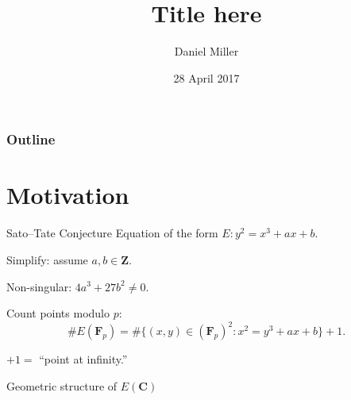 \documentclass{beamer}
\title{Title here}
\author{Daniel Miller}
\institute{Cornell University}
\date{28 April 2017}
\newcommand{\bC}{\mathbf{C}}
\newcommand{\bF}{\mathbf{F}}
\newcommand{\bZ}{\mathbf{Z}}
\begin{document}
\begin{frame}
\titlepage
\end{frame}

\begin{frame}
\frametitle{Outline}
\tableofcontents
\end{frame}





\section{Motivation}

\begin{frame}{Sato--Tate Conjecture}
Equation of the form $E:y^2=x^3+ax+b$.
\pause

Simplify: assume $a,b\in \bZ$.
\pause

Non-singular: $4a^3+27b^2\ne 0$. 
\pause

Count points modulo $p$: 
\[
	\# E(\bF_p) = \#\{(x,y)\in (\bF_p)^2 : x^2=y^3+ax+b\} + 1 .
\]
\pause

$+1=$ ``point at infinity.''
\pause

Geometric structure of $E(\bC)$
\end{frame}
\end{document}
